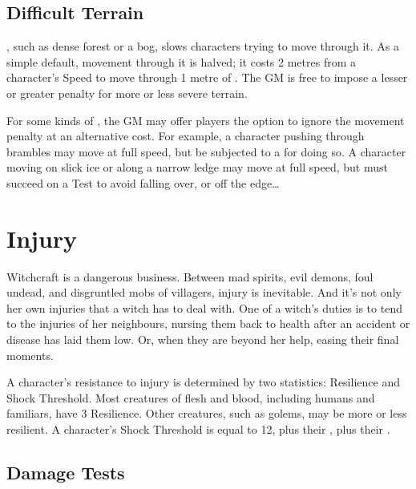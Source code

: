 

\subsection{Difficult Terrain}

, such as dense forest or a bog, slows characters trying to move through it.
As a simple default, movement through it is halved; it costs 2 metres from a character's Speed to move through 1 metre of .
The GM is free to impose a lesser or greater penalty for more or less severe terrain.

For some kinds of , the GM may offer players the option to ignore the movement penalty at an alternative cost.
For example, a character pushing through brambles may move at full speed, but be subjected to a  for doing so.
A character moving on slick ice or along a narrow ledge may move at full speed, but must succeed on a  Test to avoid falling over, or off the edge{\dots}

\section{Injury}

Witchcraft is a dangerous business.
Between mad spirits, evil demons, foul undead, and disgruntled mobs of villagers, injury is inevitable.
And it's not only her own injuries that a witch has to deal with.
One of a witch's duties is to tend to the injuries of her neighbours, nursing them back to health after an accident or disease has laid them low.
Or, when they are beyond her help, easing their final moments.

A character's resistance to injury is determined by two statistics: Resilience and Shock Threshold.
Most creatures of flesh and blood, including humans and familiars, have $3$ Resilience.
Other creatures, such as golems, may be more or less resilient.
A character's Shock Threshold is equal to 12, plus their , plus their .

\subsection{Damage Tests}


